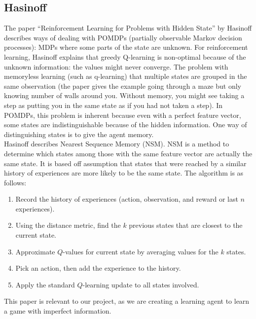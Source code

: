 \documentclass[letterpaper]{article}
\begin{document}
\subsection{Hasinoff}
The paper ``Reinforcement Learning for Problems with Hidden State'' by Hasinoff describes ways of dealing with POMDPs (partially observable Markov decision processes): MDPs where some parts of the state are unknown. For reinforcement learning, Hasinoff explains that greedy Q-learning is non-optimal because of the unknown information: the values might never converge. The problem with memoryless learning (such as q-learning) that multiple states are grouped in the same observation (the paper gives the example going through a maze but only knowing number of walls around you. Without memory, you might see taking a step as putting you in the same state as if you had not taken a step). In POMDPs, this problem is inherent because even with a perfect feature vector, some states are indistinguishable because of the hidden information. One way of distinguishing states is to give the agent memory.\\

Hasinoff describes Nearest Sequence Memory (NSM). NSM is a method to determine which states among those with the same feature vector are actually the same state. It is based off assumption that states that were reached by a similar history of experiences are more likely to be the same state. The algorithm is as follows:
\begin{enumerate}
\item Record the history of experiences (action, observation, and reward or last $n$ experiences).
\item Using the distance metric, find the $k$ previous states that are closest to the current state.
\item Approximate $Q$-values for current state by averaging values for the $k$ states.
\item Pick an action, then add the experience to the history.
\item Apply the standard $Q$-learning update to all states involved.
\end{enumerate}
This paper is relevant to our project, as we are creating a learning agent to learn a game with imperfect information. 
\\
\end{document}
